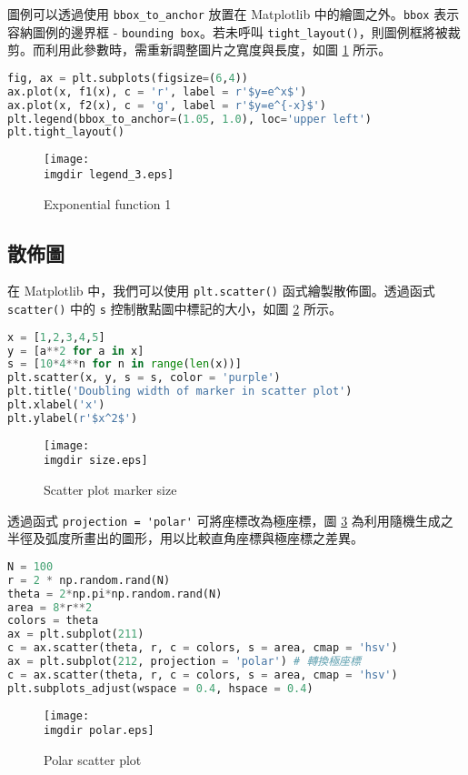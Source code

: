 圖例可以透過使用 \verb|bbox_to_anchor| 放置在 Matplotlib 中的繪圖之外。\verb|bbox| 表示容納圖例的邊界框 - \verb|bounding box|。若未呼叫 \verb|tight_layout()|，則圖例框將被裁剪。而利用此參數時，需重新調整圖片之寬度與長度，如圖 \ref{fig:legend_1} 所示。
\bigskip
\begin{lstlisting}[language = Python]
fig, ax = plt.subplots(figsize=(6,4))
ax.plot(x, f1(x), c = 'r', label = r'$y=e^x$')
ax.plot(x, f2(x), c = 'g', label = r'$y=e^{-x}$')
plt.legend(bbox_to_anchor=(1.05, 1.0), loc='upper left')
plt.tight_layout()
\end{lstlisting}

\begin{figure}[H]
    \centering
        \texttt{[image: \\imgdir legend\_3.eps]}
    \caption{Exponential function 1}
    \label{fig:legend_1}
\end{figure}
\subsection{散佈圖}
在 Matplotlib 中，我們可以使用 \verb|plt.scatter()| 函式繪製散佈圖。透過函式 \verb|scatter()| 中的 \verb|s| 控制散點圖中標記的大小，如圖 \ref{fig:size} 所示。
\begin{lstlisting}[language = Python]
x = [1,2,3,4,5]
y = [a**2 for a in x]
s = [10*4**n for n in range(len(x))]
plt.scatter(x, y, s = s, color = 'purple')
plt.title('Doubling width of marker in scatter plot')
plt.xlabel('x')
plt.ylabel(r'$x^2$')
\end{lstlisting}
\begin{figure}[H]
    \centering
        \texttt{[image: \\imgdir size.eps]}
    \caption{Scatter plot marker size}
    \label{fig:size}
\end{figure}
透過函式 \verb|projection = 'polar'| 可將座標改為極座標，圖 \ref{fig:polar} 為利用隨機生成之半徑及弧度所畫出的圖形，用以比較直角座標與極座標之差異。

\begin{lstlisting}[language = Python]
N = 100
r = 2 * np.random.rand(N) 
theta = 2*np.pi*np.random.rand(N)
area = 8*r**2 				      
colors = theta                    
ax = plt.subplot(211)
c = ax.scatter(theta, r, c = colors, s = area, cmap = 'hsv')
ax = plt.subplot(212, projection = 'polar') # 轉換極座標
c = ax.scatter(theta, r, c = colors, s = area, cmap = 'hsv')
plt.subplots_adjust(wspace = 0.4, hspace = 0.4)
\end{lstlisting}
\begin{figure}[H]
    \centering
        \texttt{[image: \\imgdir polar.eps]}
    \caption{Polar scatter plot}
    \label{fig:polar}
\end{figure}

